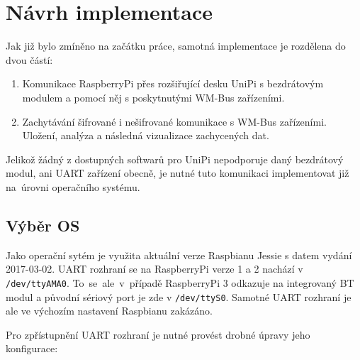 \chapter{Návrh implementace}
Jak již bylo zmíněno na začátku práce, samotná implementace je rozdělena do dvou částí:
\begin{enumerate}
	\item Komunikace RaspberryPi přes rozšiřující desku UniPi s bezdrátovým modulem a pomocí něj s poskytnutými WM-Bus zařízeními.
	\item Zachytávání šifrované i nešifrované komunikace s WM-Bus zařízeními. Uložení, analýza a následná vizualizace zachycených dat. 
\end{enumerate}

Jelikož žádný z dostupných softwarů pro UniPi nepodporuje daný bezdrátový modul, ani UART zařízení obecně, je nutné tuto komunikaci implementovat již na~úrovni operačního systému.


\section{Výběr OS}
Jako operační sytém je využita aktuální verze Raspbianu Jessie s datem vydání 2017-03-02. UART rozhraní se na RaspberryPi verze 1 a 2 nachází v \texttt{/dev/ttyAMA0}. To~se~ale~v~případě RaspberryPi 3 odkazuje na integrovaný BT modul a původní sériový port je zde v \texttt{/dev/ttyS0}. Samotné UART rozhraní je ale ve výchozím nastavení Raspbianu zakázáno.

Pro zpřístupnění UART rozhraní je nutné provést drobné úpravy jeho konfigurace:


